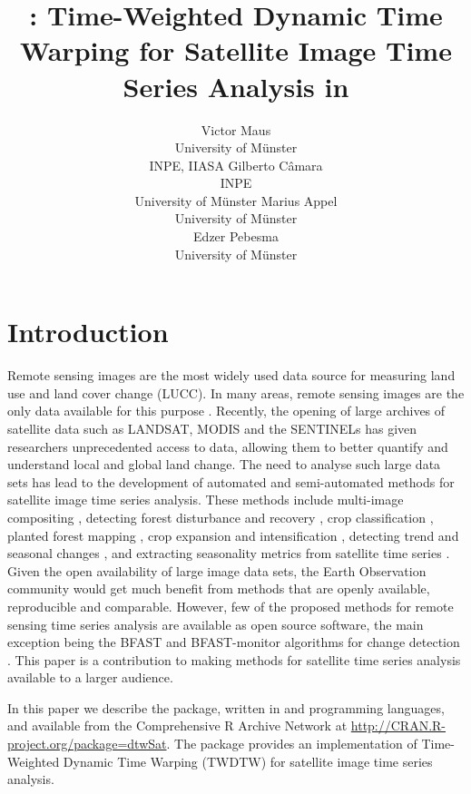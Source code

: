 \documentclass[article,shortnames]{jss}
\author{
Victor Maus\\University of Münster\\INPE, IIASA \And Gilberto Câmara\\INPE\\University of Münster \And Marius Appel\\University of Münster\\ \And Edzer Pebesma\\University of Münster\\
}
\title{\pkg{dtwSat}: Time-Weighted Dynamic Time Warping for Satellite Image
Time Series Analysis in \proglang{R}}
\begin{document}
\sloppy

\section{Introduction}\label{introduction}

Remote sensing images are the most widely used data source for measuring
land use and land cover change (LUCC). In many areas, remote sensing
images are the only data available for this purpose
\citep{Lambin:2006, Fritz:2013}. Recently, the opening of large archives
of satellite data such as LANDSAT, MODIS and the SENTINELs has given
researchers unprecedented access to data, allowing them to better
quantify and understand local and global land change. The need to
analyse such large data sets has lead to the development of automated
and semi-automated methods for satellite image time series analysis.
These methods include multi-image compositing \citep{Griffiths:2013},
detecting forest disturbance and recovery
\citep{Kennedy:2010, Zhu:2012, DeVries:2015}, crop classification
\citep{Xiao:2005, Wardlow:2007, Petitjean:2012, Maus:2016}, planted
forest mapping \citep{Maire:2014}, crop expansion and intensification
\citep{Galford:2008, Sakamoto:2009}, detecting trend and seasonal
changes
\citep{Lunetta:2006, Verbesselt:2010, Verbesselt:2010a, Verbesselt:2012},
and extracting seasonality metrics from satellite time series
\citep{Jonsson:2002, Jonsson:2004}. Given the open availability of large
image data sets, the Earth Observation community would get much benefit
from methods that are openly available, reproducible and comparable.
However, few of the proposed methods for remote sensing time series
analysis are available as open source software, the main exception being
the BFAST and BFAST-monitor algorithms for change detection
\citep{Verbesselt:2010, Verbesselt:2010a}. This paper is a contribution
to making methods for satellite time series analysis available to a
larger audience.

In this paper we describe the  package, written in
 \citep{R:2015} and  programming
languages, and available from the Comprehensive R Archive Network at
\url{http://CRAN.R-project.org/package=dtwSat}. The package provides an
implementation of Time-Weighted Dynamic Time Warping (TWDTW)
\citep{Maus:2016} for satellite image time series analysis.
\end{document}
